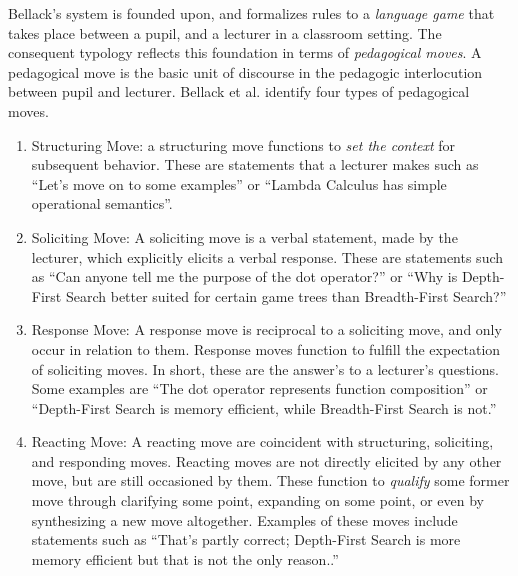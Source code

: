 \documentclass[conference]{IEEEtran}
\begin{document}
Bellack's system is founded upon, and formalizes rules to a \emph{language
  game}\cite{wittgenstein2010philosophical} that takes place between a pupil,
and a lecturer in a classroom setting. The consequent typology reflects this
foundation in terms of \emph{pedagogical moves}. A pedagogical move is the basic
unit of discourse in the pedagogic interlocution between pupil and lecturer.
Bellack et al. identify four types of pedagogical moves.
%
\begin{enumerate}[P1.]

  \item \label{contrib:struct}
    Structuring Move: a structuring move functions to \emph{set the context} for
    subsequent behavior. These are statements that a lecturer makes such as
    ``Let's move on to some examples'' or ``Lambda Calculus has simple
    operational semantics''.
  
  \item \label{contrib:solicit}
    Soliciting Move: A soliciting move is a verbal statement, made by the
    lecturer, which explicitly elicits a verbal response. These are statements
    such as ``Can anyone tell me the purpose of the dot operator?'' or ``Why is
    Depth-First Search better suited for certain game trees than Breadth-First Search?''

   \item \label{contrib:response}
     Response Move: A response move is reciprocal to a soliciting move, and only
     occur in relation to them. Response moves function to fulfill the
     expectation of soliciting moves. In short, these are the answer's to a
     lecturer's questions. Some examples are ``The dot operator represents
     function composition'' or ``Depth-First Search is memory efficient, while
     Breadth-First Search is not.''

   \item \label{contrib:react}
     Reacting Move: A reacting move are coincident with structuring, soliciting,
     and responding moves. Reacting moves are not directly elicited by any other
     move, but are still occasioned by them. These function to \emph{qualify}
     some former move through clarifying some point, expanding on some point, or
     even by synthesizing a new move altogether. Examples of these moves include
     statements such as ``That's partly correct; Depth-First Search is more
     memory efficient but that is not the only reason..''

\end{enumerate}
\end{document}
